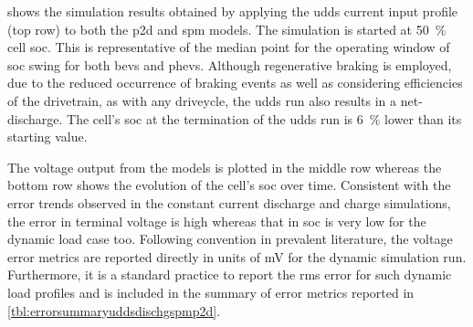   shows   the  simulation  results   obtained  by
applying the  \gls{udds} current input profile  (top row) to both  the \gls{p2d}
and  \gls{spm}  models. The  simulation  is  started at  \SI{50}{\percent}  cell
\gls{soc}. This is  representative of the median point for  the operating window
of \gls{soc} swing for both  \glspl{bev} and \glspl{phev}. Although regenerative
braking is  employed, due to  the reduced occurrence  of braking events  as well
as  considering efficiencies  of  the  drivetrain, as  with  any driveycle,  the
\gls{udds} run  also results  in a  net-discharge. The  cell's \gls{soc}  at the
termination  of the  \gls{udds} run  is \approx\SI{6}{\percent}  lower than  its
starting value.

The  voltage  output from  the  models  is plotted  in  the  middle row  whereas
the  bottom  row  shows  the  evolution  of  the  cell's  \gls{soc}  over  time.
Consistent with the error trends observed  in the constant current discharge and
charge  simulations, the  error  in terminal  voltage is  high  whereas that  in
\gls{soc} is  very low for  the dynamic load  case too. Following  convention in
prevalent  literature,  the  voltage  error metrics  are  reported  directly  in
units  of  \si{\milli\volt} for  the  dynamic  simulation run.  Furthermore,  it
is  a  standard  practice  to  report  the  \gls{rms}  error  for  such  dynamic
load  profiles  and  is  included  in the  summary  of  error  metrics  reported
in \cref{tbl:errorsummaryuddsdischgspmp2d}.




